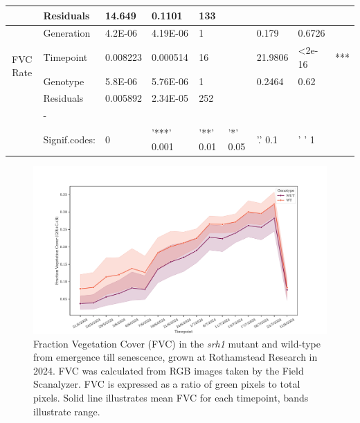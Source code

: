\documentclass{article}
\begin{document}
\begin{table}[ht]
\begin{adjustbox}
\begin{tabular}{@{}cllllllll@{}}
			                                            & Residuals     & 14.649         & 0.1101          & 133            &                &                  &                              &     \\
			\midrule \multirow{4}{*}{FVC Rate}          & Generation    & 4.2E-06        & 4.19E-06        & 1              &                & 0.179            & 0.6726                       &     \\
			                                            & Timepoint     & 0.008223       & 0.000514        & 16             &                & 21.9806          & \textless{}2e-16             & *** \\
			                                            & Genotype      & 5.8E-06        & 5.76E-06        & 1              &                & 0.2464           & 0.62                         &     \\
			                                            & Residuals     & 0.005892       & 2.34E-05        & 252            &                &                  &                              &     \\
			\multicolumn{1}{l}{}                        & -             &                &                 &                &                &                  &                              &     \\
			\multicolumn{1}{l}{}                        & Signif.codes: & 0              & '***' 0.001     & '**' 0.01      & '*' 0.05       & '.' 0.1          & ' ' 1                        &     \\
			\bottomrule
		\end{tabular}
	\end{adjustbox}
\end{table}






\begin{figure}[ht]
	\centering
	\includegraphics[width=\textwidth]{FVC.pdf}
	\caption{Fraction Vegetation Cover (FVC) in the \textit{srh1} mutant and
		wild-type from emergence till senescence, grown at Rothamstead Research
		in 2024. FVC was calculated from RGB images taken by the Field
		Scanalyzer. FVC is expressed as a ratio of green pixels to total pixels.
		Solid line illustrates mean FVC for each timepoint, bands illustrate range.}
	\label{fvc}
\end{figure}
\end{document}
